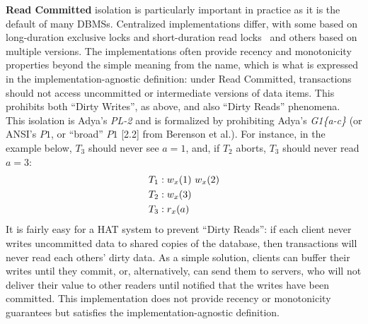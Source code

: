 \textbf{Read Committed} isolation is particularly important in
practice as it is the default of many DBMSs. Centralized
implementations differ, with some based on long-duration exclusive
locks and short-duration read locks~\cite{gray-isolation} and others
based on multiple versions. The implementations often provide recency
and monotonicity properties beyond the simple meaning from the name,
which is what is expressed in the implementation-agnostic definition:
under Read Committed, transactions should not access uncommitted or
intermediate versions of data items. This prohibits both ``Dirty
Writes'', as above, and also ``Dirty Reads'' phenomena.  This
isolation is Adya's \textit{PL-2} and is formalized by prohibiting
Adya's \textit{G1\{a-c\}} (or ANSI's $P1$, or ``broad'' $P1$ [2.2]
from Berenson et al.). For instance, in the example below, $T_3$
should never see $a=1$, and, if $T_2$ aborts, $T_3$ should never read
$a=3$:
\begin{align*}
\small\vspace{-1em}
T_1 &: w_x(1)~w_x(2)
\\T_2 &: w_x(3)\\
T_3 &: r_x(a)\vspace{-1em}
\end{align*}
It is fairly easy for a HAT system to prevent ``Dirty Reads'': if each
client never writes uncommitted data to shared copies of the database, then
transactions will never read each others' dirty data. As a simple
solution, clients can buffer their writes until they commit, or,
alternatively, can send them to servers, who will not deliver their
value to other readers until notified that the writes have been
committed. This implementation does not provide recency or
monotonicity guarantees but satisfies the implementation-agnostic
definition.

